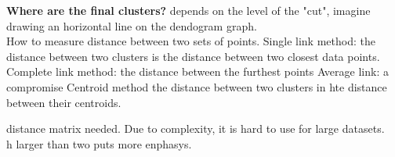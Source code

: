 \textbf{Where are the final clusters?} depends on the level of the "cut", imagine drawing an horizontal line on the dendogram graph. \\

How to measure distance between two sets of points. 
Single link method: the distance between two clusters is the distance between two closest data points. 
Complete link method: the distance between the furthest points
Average link: a compromise
Centroid method the distance between two clusters in hte distance between their centroids. 

distance matrix needed. Due to complexity, it is hard to use for large datasets.\\

h larger than two puts more enphasys.  


